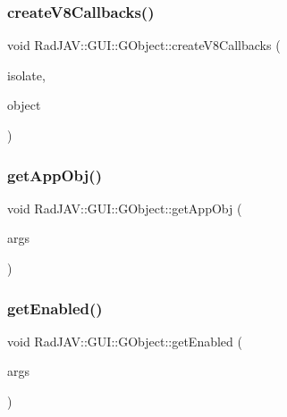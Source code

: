 \subsubsection{\texorpdfstring{create\+V8\+Callbacks()}{createV8Callbacks()}}
{\footnotesize\ttfamily void Rad\+J\+A\+V\+::\+G\+U\+I\+::\+G\+Object\+::create\+V8\+Callbacks (\begin{DoxyParamCaption}\item[{v8\+::\+Isolate $\ast$}]{isolate,  }\item[{v8\+::\+Local$<$ v8\+::\+Object $>$}]{object }\end{DoxyParamCaption})\hspace{0.3cm}{\ttfamily [static]}}

\mbox{\label{class_rad_j_a_v_1_1_g_u_i_1_1_g_object_ae90cb7df44cc67bc46a39ed99d79af81}} 
\subsubsection{\texorpdfstring{get\+App\+Obj()}{getAppObj()}}
{\footnotesize\ttfamily void Rad\+J\+A\+V\+::\+G\+U\+I\+::\+G\+Object\+::get\+App\+Obj (\begin{DoxyParamCaption}\item[{const v8\+::\+Function\+Callback\+Info$<$ v8\+::\+Value $>$ \&}]{args }\end{DoxyParamCaption})\hspace{0.3cm}{\ttfamily [static]}}

\mbox{\label{class_rad_j_a_v_1_1_g_u_i_1_1_g_object_a4e6cf5afc68c3f8b247580ea05a179db}} 
\subsubsection{\texorpdfstring{get\+Enabled()}{getEnabled()}}
{\footnotesize\ttfamily void Rad\+J\+A\+V\+::\+G\+U\+I\+::\+G\+Object\+::get\+Enabled (\begin{DoxyParamCaption}\item[{const v8\+::\+Function\+Callback\+Info$<$ v8\+::\+Value $>$ \&}]{args }\end{DoxyParamCaption})\hspace{0.3cm}{\ttfamily [static]}}

